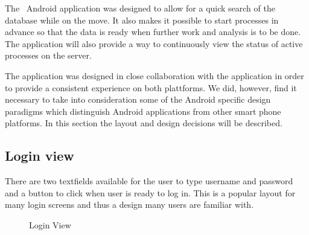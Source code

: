 


The \appName\ Android application was designed to allow for a quick search of the database while on the move. It also makes it possible to start processes in advance so that the data is ready when further work and analysis is to be done. The application will also provide a way to continuously view the status of active processes on the server. 

The application was designed in close collaboration with the  application in order to provide a consistent experience on both plattforms.  We did, however, find it necessary to take into consideration some of the Android specific design paradigms which distinguish Android applications from other smart phone platforms. In this section the layout and design decisions will be described.


\subsection{Login view}
There are two textfields available for the user to type username and password and a button to click when user is ready to log in.
This is a popular layout for many login screens and thus a design many users are familiar with.


\begin{figure}[ht]
\caption{Login View}
\label{fig:and_login}
\end{figure}
\FloatBarrier

